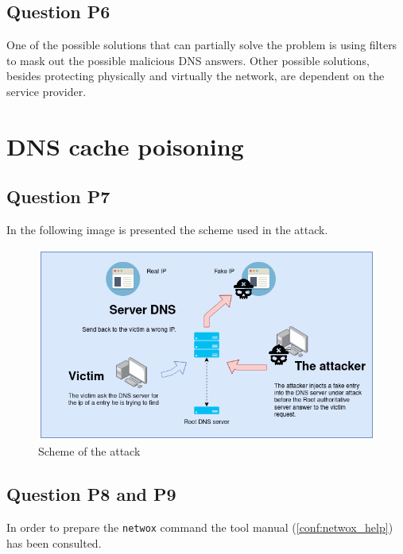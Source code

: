 \inputminted{text}{after_hijacking.txt}
\label{conf:during_hijacking}

\subsection{Question P6}
One of the possible solutions that can partially solve the problem is using filters to mask out the possible malicious DNS answers. Other possible solutions, besides protecting physically and virtually the network, are dependent on the service provider.


\section{DNS cache poisoning}

\subsection{Question P7}
In the following image is presented the scheme used in the attack.

\begin{figure}[H]
	\centering
	\includegraphics[width=\linewidth]{images/cache_poisoning_scheme.png}
	\caption{Scheme of the attack}
	\label{fig:cache_poisopning_attack}
\end{figure}

\subsection{Question P8 and P9}
In order to prepare the \texttt{netwox} command the tool manual (\ref{conf:netwox_help}) has been consulted.

\inputminted{text}{netwox_help.txt}
\label{conf:netwox_help}

